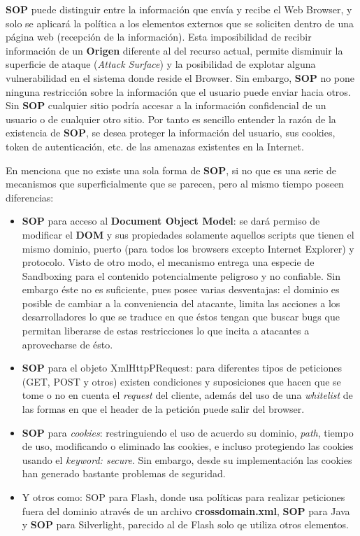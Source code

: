     \textbf{SOP} puede distinguir entre la información que envía y recibe el Web Browser, y solo se aplicará la política a los elementos externos que se soliciten dentro de una página web (recepción de la información). Esta imposibilidad de recibir información de un \textbf{Origen} diferente al del recurso actual, permite disminuir la superficie de ataque (\textit{Attack Surface}) y la posibilidad de explotar alguna vulnerabilidad en el sistema donde reside el Browser. Sin embargo, \textbf{SOP} no pone ninguna restricción sobre la información que el usuario puede enviar hacia otros. Sin \textbf{SOP} cualquier sitio podría accesar a la información confidencial de un usuario o de cualquier otro sitio. Por tanto es sencillo entender la razón de la existencia de \textbf{SOP}, se desea proteger la información del usuario, sus cookies, token de autenticación, etc. de las amenazas existentes en la Internet.


    En \cite{Zalewsk08} menciona que no existe una sola forma de \textbf{SOP}, si no que es una serie de mecanismos que superficialmente que se parecen, pero al mismo tiempo poseen diferencias:

    \begin{itemize}
        \item \textbf{SOP} para acceso al \textbf{Document Object Model}: se dará permiso de modificar el \textbf{DOM} y sus propiedades solamente aquellos scripts que tienen el mismo dominio, puerto (para todos los browsers excepto Internet Explorer) y protocolo. Visto de otro modo, el mecanismo entrega una especie de Sandboxing para el contenido potencialmente peligroso y no confiable. Sin embargo éste no es suficiente, pues posee varias desventajas: el dominio es posible de cambiar a la conveniencia del atacante, limita las acciones a los desarrolladores lo que se traduce en que éstos tengan que buscar bugs que permitan liberarse de estas restricciones lo que incita a atacantes a aprovecharse de ésto.
        \item \textbf{SOP} para el objeto XmlHttpPRequest: para diferentes tipos de peticiones (GET, POST y otros) existen condiciones y suposiciones que hacen que se tome o no en cuenta el \textit{request} del cliente, además del uso de una \textit{whitelist} de las formas en que el header de la petición puede salir del browser.
        \item \textbf{SOP} para \textit{cookies}: restringuiendo el uso de acuerdo su dominio, \textit{path}, tiempo de uso, modificando o eliminado las cookies, e incluso protegiendo las cookies usando el \textit{keyword: secure}. Sin embargo, desde su implementación las cookies han generado bastante problemas de seguridad.
        \item Y otros como: {SOP} para Flash, donde usa políticas para realizar peticiones fuera del dominio através de un archivo \textbf{crossdomain.xml}, \textbf{SOP} para Java y \textbf{SOP} para Silverlight, parecido al de Flash solo qe utiliza otros elementos.
    \end{itemize}

